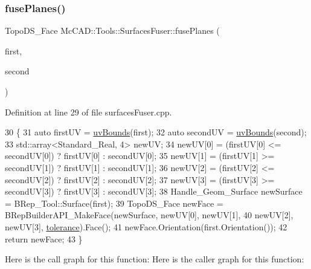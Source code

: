 \mbox{\label{classMcCAD_1_1Tools_1_1SurfacesFuser_a8afb3a95157d8185bccdc4ba5f372ada}} 
\subsubsection{\texorpdfstring{fuse\+Planes()}{fusePlanes()}\hspace{0.1cm}{\footnotesize\ttfamily [1/2]}}
{\footnotesize\ttfamily Topo\+D\+S\+\_\+\+Face Mc\+C\+A\+D\+::\+Tools\+::\+Surfaces\+Fuser\+::fuse\+Planes (\begin{DoxyParamCaption}\item[{const Topo\+D\+S\+\_\+\+Face \&}]{first,  }\item[{const Topo\+D\+S\+\_\+\+Face \&}]{second }\end{DoxyParamCaption})\hspace{0.3cm}{\ttfamily [private]}}



Definition at line 29 of file surfaces\+Fuser.\+cpp.


\begin{DoxyCode}
30                                                                   \{
31     \textcolor{keyword}{auto} firstUV = \hyperlink{classMcCAD_1_1Tools_1_1SurfacesFuser_a5525c22611c4982eeded8b867928e2db}{uvBounds}(first);
32     \textcolor{keyword}{auto} secondUV = \hyperlink{classMcCAD_1_1Tools_1_1SurfacesFuser_a5525c22611c4982eeded8b867928e2db}{uvBounds}(second);
33     std::array<Standard\_Real, 4> newUV;
34     newUV[0] = (firstUV[0] <= secondUV[0]) ? firstUV[0] : secondUV[0];
35     newUV[1] = (firstUV[1] >= secondUV[1]) ? firstUV[1] : secondUV[1];
36     newUV[2] = (firstUV[2] <= secondUV[2]) ? firstUV[2] : secondUV[2];
37     newUV[3] = (firstUV[3] >= secondUV[3]) ? firstUV[3] : secondUV[3];
38     Handle\_Geom\_Surface newSurface = BRep\_Tool::Surface(first);
39     TopoDS\_Face newFace = BRepBuilderAPI\_MakeFace(newSurface, newUV[0], newUV[1],
40             newUV[2], newUV[3], \hyperlink{classMcCAD_1_1Tools_1_1SurfacesFuser_ad93b6c71e01c6b0692203d1671b7e8a4}{tolerance}).Face();
41     newFace.Orientation(first.Orientation());
42     \textcolor{keywordflow}{return} newFace;
43 \}
\end{DoxyCode}
Here is the call graph for this function\+:
Here is the caller graph for this function\+:
\mbox{\label{classMcCAD_1_1Tools_1_1SurfacesFuser_a8afb3a95157d8185bccdc4ba5f372ada}} 

